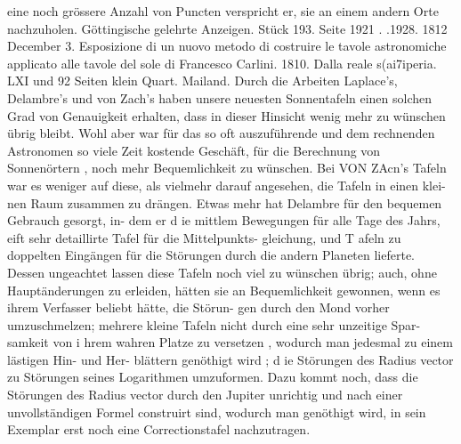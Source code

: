 \documentclass[12pt,a4paper]{article}
\begin{document}
eine noch grössere Anzahl von Puncten verspricht er, sie an einem andern Orte nachzuholen.\newline
Göttingische gelehrte Anzeigen. Stück 193. Seite 1921 . .1928. 1812 December 3.\newline
Esposizione di un nuovo metodo di costruire le tavole astronomiche applicato alle tavole del sole di\newline
Francesco Carlini. 1810. Dalla reale s(ai7iperia. LXI und 92 Seiten klein Quart. Mailand.\newline
Durch die Arbeiten Laplace's, Delambre's und von Zach's haben unsere neuesten Sonnentafeln\newline
einen solchen Grad von Genauigkeit erhalten, dass in dieser Hinsicht wenig mehr zu wünschen übrig\newline
bleibt. Wohl aber war für das so oft auszuführende und dem rechnenden Astronomen so viele Zeit\newline
kostende Geschäft, für die Berechnung von Sonnenörtern , noch mehr Bequemlichkeit zu wünschen. Bei\newline
VON ZAcn's Tafeln war es weniger auf diese, als vielmehr darauf angesehen, die Tafeln in einen klei-\newline
nen Raum zusammen zu drängen. Etwas mehr hat Delambre für den bequemen Gebrauch gesorgt, in-\newline
dem er d ie mittlem Bewegungen für alle Tage des Jahrs, eift sehr detaillirte Tafel für die Mittelpunkts-\newline
gleichung, und T afeln zu doppelten Eingängen für die Störungen durch die andern Planeten lieferte.\newline
Dessen ungeachtet lassen diese Tafeln noch viel zu wünschen übrig; auch, ohne Hauptänderungen zu\newline
erleiden, hätten sie an Bequemlichkeit gewonnen, wenn es ihrem Verfasser beliebt hätte, die Störun-\newline
gen durch den Mond vorher umzuschmelzen; mehrere kleine Tafeln nicht durch eine sehr unzeitige Spar-\newline
samkeit von i hrem wahren Platze zu versetzen , wodurch man jedesmal zu einem lästigen Hin- und Her-\newline
blättern genöthigt wird ; d ie Störungen des Radius vector zu Störungen seines Logarithmen umzuformen.\newline
Dazu kommt noch, dass die Störungen des Radius vector durch den Jupiter unrichtig und nach einer\newline
unvollständigen Formel construirt sind, wodurch man genöthigt wird, in sein Exemplar erst noch eine\newline
Correctionstafel nachzutragen.\newline
\end{document}
